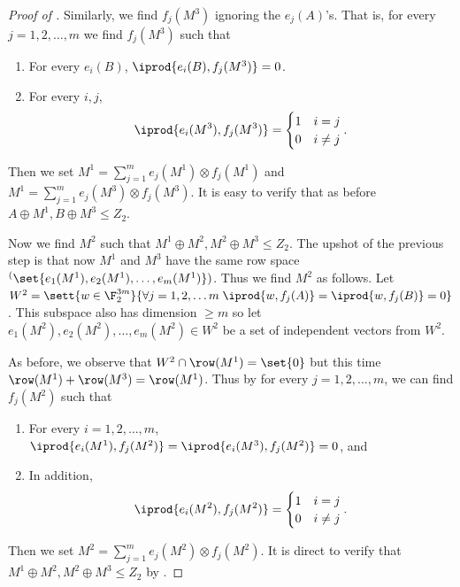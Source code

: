 \begin{proof}[Proof of ]
    Similarly, we find \(f_j(M^3)\) ignoring the \(e_j(A)\)'s. That is, for every \(j=1,2,\dots,m\) we find \(f_j(M^3)\) such that 
    \begin{enumerate}
        \item For every \(e_i(B)\), \(\iprod{e_i(B),f_j(M^3)}=0\).
        \item For every \(i,j\), \[\iprod{e_i(M^3),f_j(M^3)} = \begin{cases}
        1 & i=j \\ 0 & i \ne j
    \end{cases}.\]
    \end{enumerate}
    
    Then we set \(M^1 = \sum_{j=1}^{m} e_j(M^1) \otimes f_j(M^1)\) and \(M^1 = \sum_{j=1}^{m} e_j(M^3) \otimes f_j(M^3)\). It is easy to verify that as before \(A \oplus M^1, B \oplus M^3 \leq Z_2\).

    Now we find \(M^2\) such that \(M^1 \oplus M^2, M^2 \oplus M^3 \leq Z_2\). The upshot of the previous step is that now \(M^1\) and \(M^3\) have the same row space \(\sp(\set{e_1(M^1),e_2(M^1),\dots,e_{m}(M^1)})\). Thus we find \(M^2\) as follows. Let \(W^2 = \sett{w \in \F_2^{3m}}{\forall j=1,2,\dots m \; \iprod{w,f_j(A)}=\iprod{w,f_j(B)}=0}\). This subspace also has dimension \(\geq m\) so let \(e_1(M^2),e_2(M^2),\dots,e_{m}(M^2) \in W^2\) be a set of independent vectors from $W^2$.

    As before, we observe that \(W^2 \cap \row(M^1) = \set{0}\) but this time \(\row(M^1) + \row(M^3) = \row(M^1)\). Thus by  for every \(j=1,2,\dots,m\), we can find \(f_j(M^2)\) such that 
    \begin{enumerate}
        \item For every \(i=1,2,\dots,m\), \(\iprod{e_i(M^1),f_j(M^2)}=\iprod{e_i(M^3),f_j(M^2)} = 0\), and
        \item In addition, \[\iprod{e_i(M^2),f_j(M^2)} = \begin{cases}
        1 & i=j \\ 0 & i \ne j
    \end{cases}.\]
    \end{enumerate}
    Then we set \(M^2 = \sum_{j=1}^{m} e_j(M^2) \otimes f_j(M^2)\). It is direct to verify that \(M^1 \oplus M^2, M^2 \oplus M^3 \leq Z_2\) by . 
\end{proof}

